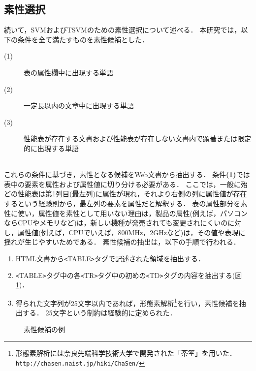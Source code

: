 \subsection{素性選択}\label{sec3.3}
続いて，SVMおよびTSVMのための素性選択について述べる．
本研究では，以下の条件を全て満たすものを素性候補とした．
\begin{description}
\item[(1)] 表の属性欄中に出現する単語
\item[(2)] 一定長以内の文章中に出現する単語 
\item[(3)] 性能表が存在する文書および性能表が存在しない文書内で顕著または限定的に出現する単語 \vspace{-1cm}
\end{description}\mbox{}\\
これらの条件に基づき，素性となる候補をWeb文書から抽出する．
条件{\bf (1)}では表中の要素を属性および属性値に切り分ける必要がある．
ここでは，一般に殆どの性能表は第1列目(最左列)に属性が現れ，それより右側の列に属性値が存在するという経験則から，最左列の要素を属性だと解釈する．
表の属性部分を素性に使い，属性値を素性として用いない理由は，製品の属性(例えば，パソコンならCPUやメモリなど)は，新しい機種が発売されても変更されにくいのに対し，属性値(例えば，CPUでいえば，800MHz，2GHzなど)は，その値や表現に揺れが生じやすいためである．
素性候補の抽出は，以下の手順で行われる．
\begin{enumerate}
\item HTML文書から\verb+<+TABLE\verb+>+タグで記述された領域を抽出する．
\item \verb+<+TABLE\verb+>+タグ中の各\verb+<+TR\verb+>+タグ中の初めの\verb+<+TD\verb+>+タグの内容を抽出する(図\ref{tdandtr})．
\item 得られた文字列が25文字以内であれば，形態素解析\footnote{形態素解析には奈良先端科学技術大学で開発された「茶筌」を用いた．\verb+http://chasen.naist.jp/hiki/ChaSen/+}を行い，素性候補を抽出する．
25文字という制約は経験的に定められた．
\end{enumerate}

\begin{figure}
\begin{center}
\end{center}
\caption{素性候補の例}
\label{tdandtr}
\end{figure}

